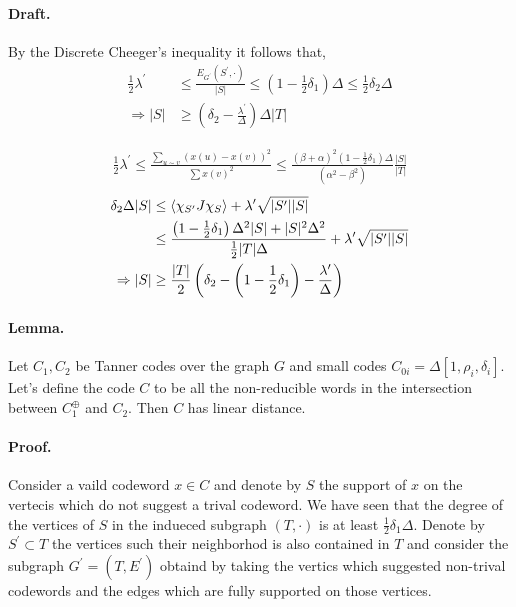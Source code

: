 \begin{multicols*}{2}
  \paragraph{Draft.} By the Discrete Cheeger's inequality it follows that, 
  \begin{equation*}
    \begin{split}
      \frac{1}{2}\lambda^{\prime} & \le \frac{E_{G^{\prime}}\left(S^{\prime}, \cdot  \right)}{|S|}\le \left( 1-\frac{1}{2}\delta_{1} \right)\Delta \le \frac{1}{2}\delta_{2}\Delta \\
      \Rightarrow |S| & \ge \left( \delta_{2} - \frac{\lambda^{\prime}}{\Delta}  \right)\Delta|T| 
    \end{split}
  \end{equation*}

  \begin{equation*}
    \begin{split}
      \frac{1}{2}\lambda^{\prime} \le \frac{ \sum_{u\sim v }{ \left( x(u)-x(v) \right)^{2}  }}{\sum{x\left( v \right)^{2}}} \le \frac{\left( \beta+\alpha \right)^{2}\left( 1-\frac{1}{2}\delta_{1} \right)\Delta}{\left( \alpha^{2}-\beta^{2} \right) } \frac{|S|}{|T|} 
    \end{split}
  \end{equation*}
  \begin{equation*}
    \begin{split}
      \delta_{2}\Delta|S| & \le \braket{ \chi_{S^{\prime}}   J \chi_{S}    } + \lambda^{\prime}\sqrt{|S^{\prime}||S|} \\ 
      & \le \frac{\left( 1- \frac{1}{2}\delta_{1} \right)\Delta^{2}|S|+|S|^{2}\Delta^{2}}{\frac{1}{2}|T|\Delta} + \lambda^{\prime}\sqrt{|S^{\prime}||S|} \\ 
      \Rightarrow |S| & \ge \frac{|T|}{2}\left( \delta_{2} - \left( 1 - \frac{1}{2}\delta_{1} \right)-\frac{\lambda^{\prime}}{\Delta} \right)
    \end{split}
  \end{equation*}

  \paragraph{Lemma.} Let $C_{1} , C_{2}$ be Tanner codes over the graph $G$ and small codes $C_{0i} = \Delta[1, \rho_{i}, \delta_{i}]$. Let's define the code $C$ to be all the non-reducible words in the intersection between $C_{1}^{\oplus}$ and $C_{2}$. Then $C$ has linear distance. 
  \paragraph{Proof.} Consider a vaild codeword $x \in C$ and denote by $S$ the support of $x$ on the vertecis which do not suggest a trival codeword. We have seen that the degree of the vertices of $S$ in the indueced subgraph $\left( T, \cdot \right)$ is at least $\frac{1}{2}\delta_{1}\Delta$. Denote by $S^{\prime} \subset T $ the vertices such their neighborhod is also contained in $T$ and consider the subgraph $G^{\prime}=\left( T, E^{\prime} \right)$ obtaind by taking the vertics which suggested non-trival codewords and the edges which are fully supported on those vertices. 



\end{multicols*}
